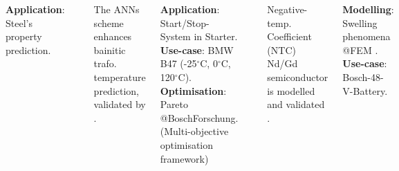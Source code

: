 \documentclass[25pt, a0paper,
portrait,
margin=2mm, 
innermargin=2mm, 
blockverticalspace=7mm, %
colspace=2mm, %
subcolspace=0mm]{tikzposter}
\makeatletter
\newcommand*{\inputfig}[3][htb]{{
    \def\fps@figure{#1}
    \def\DIR{#2}
    \def\LABEL{#3}
    \graphicspath{{\DIR/}}
    
}}
\makeatother
\begin{document}
\begin{columns}
	{
		{
			\textbf{Application}: Steel's property prediction.
			\begin{center}
				\inputfig{floats/ann}{ann}
			\end{center}
			The ANNs scheme 
			enhances bainitic trafo. temperature prediction, validated by \cite{hueter2020}.
		}
		{
			\textbf{Application}: Start/Stop-System in Starter.\\
			\textbf{Use-case}: BMW B47 (-25$^{\circ}$C, 0$^{\circ}$C, 120$^{\circ}$C).\\
			\textbf{Optimisation}: Pareto @BoschForschung.
			(Multi-objective optimisation framework)
			\vspace{-8mm}
			\begin{center}
				\inputfig{floats/semiconductorBA}{semiconductorBA}
			\end{center}
			\vspace{-10mm}
			Negative-temp. Coefficient (NTC)
			Nd/Gd semiconductor
			is modelled and validated \cite{vo2014}.
		}
		{
			\textbf{Modelling}: Swelling phenomena @FEM \cite{vo2018}.\\
			\textbf{Use-case}: Bosch-48-V-Battery.
		}
	}
	

\end{columns}
\end{document}
